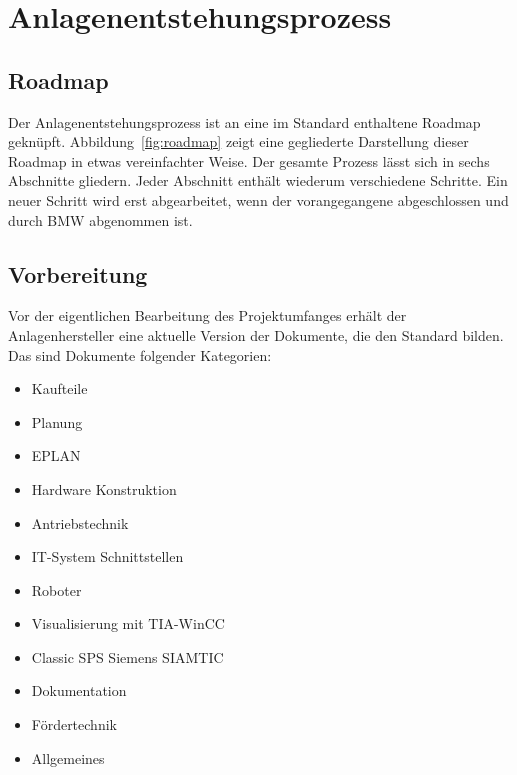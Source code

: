 

\chapter{Anlagenentstehungsprozess}
\section{Roadmap}
Der Anlagenentstehungsprozess ist an eine im Standard enthaltene Roadmap geknüpft. Abbildung~\ref{fig:roadmap} zeigt eine gegliederte Darstellung dieser Roadmap in etwas vereinfachter Weise. %
Der gesamte Prozess lässt sich in sechs Abschnitte gliedern. Jeder Abschnitt enthält wiederum verschiedene Schritte. Ein neuer Schritt wird erst abgearbeitet, wenn der vorangegangene abgeschlossen und durch BMW abgenommen ist.

\section{Vorbereitung}
Vor der eigentlichen Bearbeitung des Projektumfanges erhält der Anlagenhersteller eine aktuelle Version der Dokumente, die den Standard bilden. Das sind Dokumente folgender Kategorien:
  \begin{itemize}
    \itemsep0.1em
    \item Kaufteile
    \item Planung
    \item EPLAN
    \item Hardware Konstruktion
    \item Antriebstechnik
    \item IT-System Schnittstellen
    \item Roboter
    \item Visualisierung mit TIA-WinCC
    \item Classic SPS Siemens SIAMTIC
    \item Dokumentation
    \item Fördertechnik
    \item Allgemeines
  \end{itemize}

